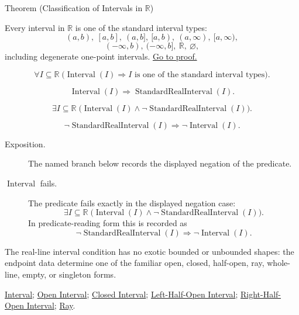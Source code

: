 \begin{theorembox}{Theorem (Classification of Intervals in $\mathbb{R}$)}
\begin{theorem}
\label{thm:classification-of-intervals-in-r}
Every interval in $\mathbb{R}$ is one of the standard interval types:
\[
(a,b),\ [a,b],\ (a,b],\ [a,b),\ (a,\infty),\ [a,\infty),
\]
\[
(-\infty,b),\ (-\infty,b],\ \mathbb{R},\ \varnothing,
\]
including degenerate one-point intervals.
\hyperref[prf:classification-of-intervals-in-r]{Go to proof.}
\end{theorem}
\end{theorembox}
\begin{remark*}
\[
\forall I\subseteq\mathbb{R}\;
\bigl(\operatorname{Interval}(I)\Rightarrow
I\text{ is one of the standard interval types}\bigr).
\]
\end{remark*}
\begin{remark*}
\[
\operatorname{Interval}(I)\Longrightarrow \operatorname{StandardRealInterval}(I).
\]
\end{remark*}
\begin{remark*}
\[
\exists I\subseteq\mathbb{R}\;
\bigl(\operatorname{Interval}(I)\land
\neg\operatorname{StandardRealInterval}(I)\bigr).
\]
\end{remark*}
\begin{remark*}
\[
\neg\operatorname{StandardRealInterval}(I)\Longrightarrow \neg\operatorname{Interval}(I).
\]
\end{remark*}

\begin{remark*}
\begin{description}
  \item[Exposition.] The named branch below records the displayed negation of the predicate.
  \item[\(\operatorname{Interval}\) fails.] The predicate fails exactly in the displayed negation case:
  \[
  \exists I\subseteq\mathbb{R}\;
  \bigl(\operatorname{Interval}(I)\land
  \neg\operatorname{StandardRealInterval}(I)\bigr).
  \]
  In predicate-reading form this is recorded as
  \[
  \neg\operatorname{StandardRealInterval}(I)\Longrightarrow \neg\operatorname{Interval}(I).
  \]
\end{description}
\end{remark*}
\begin{remark*}[Interpretation]
The real-line interval condition has no exotic bounded or unbounded shapes:
the endpoint data determine one of the familiar open, closed, half-open, ray,
whole-line, empty, or singleton forms.
\end{remark*}
\begin{dependencies}
\hyperref[def:interval]{Interval};
\hyperref[def:open-interval]{Open Interval};
\hyperref[def:closed-interval]{Closed Interval};
\hyperref[def:left-half-open-interval]{Left-Half-Open Interval};
\hyperref[def:right-half-open-interval]{Right-Half-Open Interval};
\hyperref[def:ray]{Ray}.
\end{dependencies}

